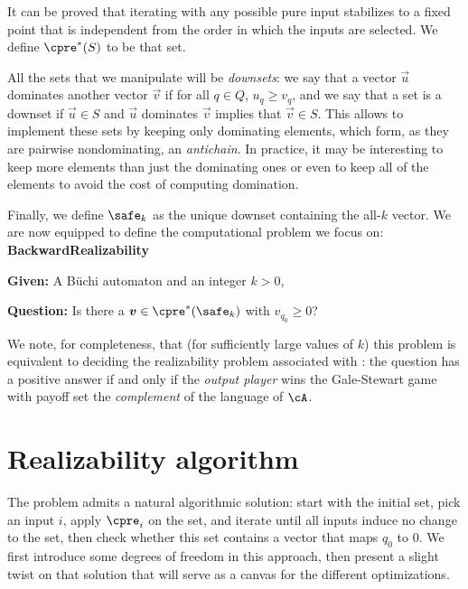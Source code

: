 \documentclass[runningheads,a4paper]{llncs}
\begin{document}
It can be proved that iterating \cpre with any possible pure input stabilizes to
a fixed point that is independent from the order in which the inputs are
selected.  We define \(\cpre^*(S)\) to be that set.

All the sets that we manipulate will be \emph{downsets}: we say that a vector
\(\vec{u}\) dominates another vector \(\vec{v}\) if for all \(q \in Q\),
\(u_q \geq v_q\), and we say that a set is a downset if \(\vec{u} \in S\) and
\(\vec{u}\) dominates \(\vec{v}\) implies that \(\vec{v} \in S\).  This allows to
implement these sets by keeping only dominating elements, which form, as they
are pairwise nondominating, an \emph{antichain}.  In practice, it may be
interesting to keep more elements than just the dominating ones or even to keep
all of the elements to avoid the cost of computing domination.

Finally, we define \(\safe_k\) as the unique downset containing the all-\(k\)
vector.
We are now equipped to define the computational problem we focus on:\\[1em]
\textbf{BackwardRealizability}
\begin{compactitem}
\item \textbf{Given:} A Büchi automaton \cA and an integer \(k > 0\),
\item \textbf{Question:} Is there a \(\vec{v} \in \cpre^*(\safe_k)\) with \(v_{q_0} \geq
  0\)?
\end{compactitem}

We note, for completeness, that (for sufficiently large values of $k$) this
problem is equivalent to deciding the realizability problem associated with
\cA: the question has a positive answer if and only if the \emph{output player} wins the
Gale-Stewart game with payoff set the \emph{complement} of the language of \(\cA\).

\section{Realizability algorithm}

The problem admits a natural algorithmic solution: start with the initial set,
pick an input \(i\), apply \(\cpre_i\) on the set, and iterate until all
inputs induce no change to the set, then check whether this set contains a
vector that maps \(q_0\) to \(0\).  We first introduce some degrees of freedom
in this approach, then present a slight twist on that solution that will serve
as a canvas for the different optimizations.
\end{document}
